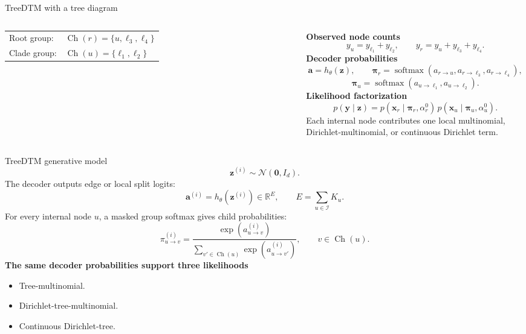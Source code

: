 \documentclass[aspectratio=169,10pt]{beamer}
\newcommand{\R}{\mathbb R}
\newcommand{\softmax}{\operatorname{softmax}}
\newcommand{\I}{\mathcal I}
\newcommand{\Ch}{\operatorname{Ch}}
\begin{document}
\begin{frame}{TreeDTM with a tree diagram}
\small
\begin{columns}[T,onlytextwidth]
\centering
{}
\vspace{1mm}

\scriptsize
\begin{tabular}{ll}
Root group: & \(\Ch(r)=\{u,\ell_3,\ell_4\}\)\\
Clade group: & \(\Ch(u)=\{\ell_1,\ell_2\}\)
\end{tabular}
\textbf{Observed node counts}
\[
y_u=y_{\ell_1}+y_{\ell_2},\qquad
y_r=y_u+y_{\ell_3}+y_{\ell_4}.
\]
\textbf{Decoder probabilities}
\[
\bm a=h_\theta(\bm z),\qquad
\bm\pi_r=\softmax(a_{r\to u},a_{r\to \ell_3},a_{r\to \ell_4}),
\]
\[
\bm\pi_u=\softmax(a_{u\to \ell_1},a_{u\to \ell_2}).
\]
\textbf{Likelihood factorization}
\[
p(\bm y\mid\bm z)
=p(\bm x_r\mid \bm\pi_r,\alpha_r^0)\,
 p(\bm x_u\mid \bm\pi_u,\alpha_u^0).
\]
Each internal node contributes one local multinomial, Dirichlet-multinomial, or continuous Dirichlet term.
\end{columns}
\end{frame}

\begin{frame}{TreeDTM generative model}
\small
\[
\bm z^{(i)}\sim\mathcal N(\bm0,I_d).
\]
The decoder outputs edge or local split logits:
\[
\bm a^{(i)}=h_\theta(\bm z^{(i)})\in\R^E,
\qquad
E=\sum_{u\in\I}K_u.
\]
For every internal node \(u\), a masked group softmax gives child probabilities:
\[
\pi^{(i)}_{u\to v}
=
\frac{\exp(a^{(i)}_{u\to v})}
{\sum_{v'\in\Ch(u)}\exp(a^{(i)}_{u\to v'})},
\qquad v\in\Ch(u).
\]
\textbf{The same decoder probabilities support three likelihoods}
\begin{itemize}
  \item Tree-multinomial.
  \item Dirichlet-tree-multinomial.
  \item Continuous Dirichlet-tree.
\end{itemize}
\end{frame}
\end{document}
